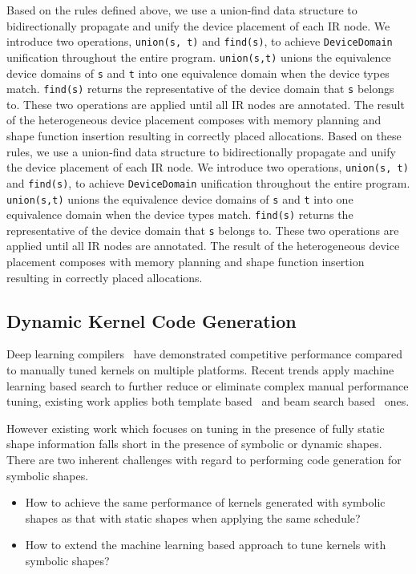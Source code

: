 Based on the rules defined above, we use a union-find data structure to bidirectionally
  propagate and unify the device placement of each IR node.
We introduce two operations, \texttt{union(s, t)} and \texttt{find(s)},
  to achieve \texttt{DeviceDomain} unification throughout the entire program.
\texttt{union(s,t)} unions the equivalence device domains of \texttt{s} and \texttt{t}
  into one equivalence domain when the device types match.
\texttt{find(s)} returns the representative of the device domain
  that \texttt{s} belongs to.
These two operations are applied until all IR nodes are annotated.
The result of the heterogeneous device placement composes with memory planning
  and shape function insertion resulting in correctly placed allocations.
Based on these rules, we use a union-find data structure to
  bidirectionally propagate and unify the device placement of each IR node.
We introduce two operations, \texttt{union(s, t)} and \texttt{find(s)},
  to achieve \texttt{DeviceDomain} unification throughout the entire program.
\texttt{union(s,t)} unions the equivalence device domains of \texttt{s}
  and \texttt{t} into one equivalence domain when the device types match.
\texttt{find(s)} returns the representative of the device domain that \texttt{s} belongs to.
These two operations are applied until all IR nodes are annotated.
The result of the heterogeneous device placement composes with memory planning and shape function insertion resulting in
correctly placed allocations.

\subsection{Dynamic Kernel Code Generation}
\label{sec:compliation:codegen}

Deep learning compilers~\citep{tvm_osdi18, halide} have demonstrated competitive performance
  compared to manually tuned kernels on multiple platforms.
Recent trends apply machine learning based search to further reduce or eliminate complex manual performance tuning,
  existing work applies both template based~\citep{chen2018learning, zheng2020flextensor} and beam search based~\citep{adams2019learning} ones.

However existing work which focuses on tuning in the presence of fully static shape information falls short
  in the presence of symbolic or dynamic shapes.
There are two inherent challenges with regard to performing code generation for symbolic shapes.
\begin{itemize}
    \item How to achieve the same performance of kernels generated with symbolic shapes as
          that with static shapes when applying the same schedule?
    \item How to extend the machine learning based approach to tune kernels with symbolic shapes?
\end{itemize}

